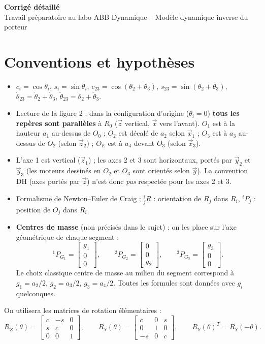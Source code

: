 \documentclass[11pt,a4paper]{article}
\newcommand{\dt}[1]{\dot\theta_{#1}}\newcommand{\ddt}[1]{\ddot\theta_{#1}}
\newcommand{\dtt}{\dot\theta_{23}}\newcommand{\ddtt}{\ddot\theta_{23}}
\newcommand{\col}[3]{\begin{bmatrix}#1\\#2\\#3\end{bmatrix}}
\begin{document}
\begin{center}{\LARGE\bfseries Corrigé détaillé}\\[4pt]{\large Travail préparatoire au labo ABB Dynamique -- Modèle dynamique inverse du porteur}\end{center}

\section*{Conventions et hypothèses}
\begin{itemize}
\item $c_i=\cos\theta_i$, $s_i=\sin\theta_i$, $c_{23}=\cos(\theta_2+\theta_3)$, $s_{23}=\sin(\theta_2+\theta_3)$, $\dtt=\dt2+\dt3$, $\ddtt=\ddt2+\ddt3$.
\item Lecture de la figure 2 : dans la configuration d'origine ($\theta_i=0$) \textbf{tous les repères sont parallèles} à $R_0$ ($\vec z$ vertical, $\vec x$ vers l'avant).
$O_1$ est à la hauteur $a_1$ au-dessus de $O_0$ ; $O_2$ est décalé de $a_2$ selon $\vec x_1$ ; $O_3$ est à $a_3$ au-dessus de $O_2$ (selon $\vec z_2$) ; $O_E$ est à $a_4$ devant $O_3$ (selon $\vec x_3$).
\item L'axe 1 est vertical ($\vec z_1$) ; les axes 2 et 3 sont horizontaux, portés par $\vec y_2$ et $\vec y_3$ (les moteurs dessinés en $O_2$ et $O_3$ sont orientés selon $\vec y$). La convention DH (axes portés par $\vec z$) n'est donc \emph{pas} respectée pour les axes 2 et 3.
\item Formalisme de Newton--Euler de Craig ; ${}^{i}_{j}R$ : orientation de $R_j$ dans $R_i$, ${}^iP_j$ : position de $O_j$ dans $R_i$.
\item \textbf{Centres de masse} (non précisés dans le sujet) : on les place sur l'axe géométrique de chaque segment :
\[{}^1P_{G_1}=\col{g_1}{0}{0},\qquad {}^2P_{G_2}=\col{0}{0}{g_2},\qquad {}^3P_{G_3}=\col{g_3}{0}{0}.\]
Le choix classique \og centre de masse au milieu du segment\fg{} correspond à $g_1=a_2/2$, $g_2=a_3/2$, $g_3=a_4/2$. Toutes les formules sont données avec $g_i$ quelconques.
\end{itemize}
On utilisera les matrices de rotation élémentaires :
\[R_Z(\theta)=\begin{bmatrix}c&-s&0\\s&c&0\\0&0&1\end{bmatrix},\qquad R_Y(\theta)=\begin{bmatrix}c&0&s\\0&1&0\\-s&0&c\end{bmatrix},\qquad R_Y(\theta)^T=R_Y(-\theta).\]
\end{document}
